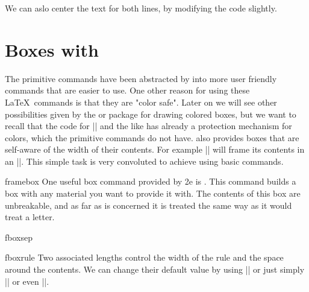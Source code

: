 {\noindent
{}%

We can aslo center the text for both lines, by modifying the code slightly.
\begin{teX}
\noindent
{}%
\end{teX}


\noindent
{}%



\chapter{Boxes with \protect\LaTeXe}

The \tex primitive commands have been abstracted by \latexe into more user friendly commands that are easier to use. One other reason for using these \LaTeX\ commands is that they are "color safe". Later on we will see other possibilities given by the  or  package for drawing colored boxes, but we want to recall that the code for |\makebox| and the like has already a protection mechanism for colors, which the primitive commands do not have. \latexe also provides boxes that are self-aware of the width of their contents. For example |\fbox| will frame its contents in an |\hbox|. This simple task is very convoluted to achieve using basic \tex commands. 

\begin{docCommand}{framebox} {}
One useful box command provided by \latex2e is \cmd{\framebox}. This command builds a box with any material you want to provide it with. The contents of this box are unbreakable, and as far as \tex is concerned it is treated the same way as it would treat a letter. 
\end{docCommand}
\begin{docCommand}{fboxsep}{}
\begin{docCommand}{fboxrule}{}
Two associated lengths control the width of the rule and the space around the contents. We can change their default value by using |\setlength{\fboxsep}{0pt}| or just simply |\fboxsep=0pt| or even ||. 
\end{docCommand}
\end{docCommand}

}
